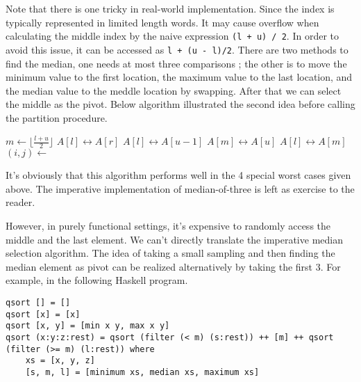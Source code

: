 \documentclass[UTF8]{article}
\begin{document}
Note that there is one tricky in real-world implementation. Since the index is typically represented
in limited length words. It may cause overflow when calculating the middle index by
the naive expression \verb|(l + u) / 2|. In order to avoid this issue, it can be accessed
as \verb|l + (u - l)/2|. There are two methods to find the median, one needs at most three
comparisons \cite{3-way-part}; the other is to move the minimum value to the first location, the maximum value
to the last location, and the median value to the meddle location by swapping. After that
we can select the middle as the pivot.
Below algorithm illustrated the second idea before calling the partition procedure.

\begin{algorithmic}[1]
    \State $m \gets \lfloor \frac{l + u}{2} \rfloor$ 
     
      \State {} $A[l] \leftrightarrow A[r]$
    \EndIf
     
      \State {} $A[l] \leftrightarrow A[u-1]$
    \EndIf
     
      \State {} $A[m] \leftrightarrow A[u]$
    \EndIf
    \State {} $A[l] \leftrightarrow A[m]$
    \State $(i, j) \gets $ 
    \State {}
    \State {}
  \EndIf
\EndProcedure
\end{algorithmic}

It's obviously that this algorithm performs well in the 4 special worst cases given above.
The imperative implementation of median-of-three is left as exercise to the reader.

However, in purely functional settings, it's expensive to randomly access the middle and the last
element. We can't directly translate the imperative median selection algorithm. The idea of
taking a small sampling and then finding the median element as pivot can be realized alternatively
by taking the first 3. For example, in the following Haskell program.

\lstset{language=Haskell}
\begin{lstlisting}
qsort [] = []
qsort [x] = [x]
qsort [x, y] = [min x y, max x y]
qsort (x:y:z:rest) = qsort (filter (< m) (s:rest)) ++ [m] ++ qsort (filter (>= m) (l:rest)) where
    xs = [x, y, z]
    [s, m, l] = [minimum xs, median xs, maximum xs]
\end{lstlisting}
\end{document}
